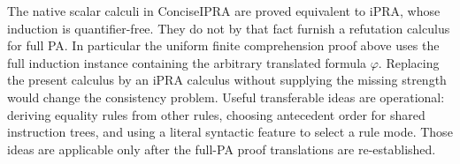 The native scalar calculi in ConciseIPRA are proved equivalent to iPRA,
whose induction is quantifier-free. They do not by that fact furnish a
refutation calculus for full PA. In particular the uniform finite
comprehension proof above uses the full induction instance containing
the arbitrary translated formula $\varphi$. Replacing the present calculus
by an iPRA calculus without supplying the missing strength would change the
consistency problem. Useful transferable ideas are operational: deriving
equality rules from other rules, choosing antecedent order for shared
instruction trees, and using a literal syntactic feature to select a rule
mode. Those ideas are applicable only after the full-PA proof translations
are re-established.
